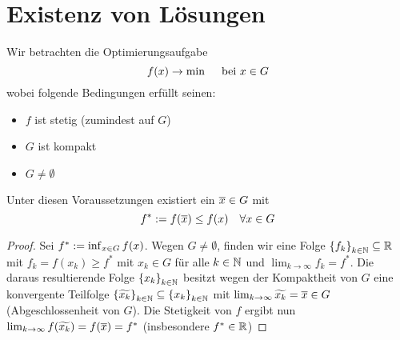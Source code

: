 \section{Existenz von Lösungen}

Wir betrachten die Optimierungsaufgabe
\begin{equation}
	f(x) \to \min \quad \text{ bei } x \in G \label{eq: 2.1}
\end{equation}
wobei folgende Bedingungen erfüllt seinen:
\begin{itemize}[nolistsep, topsep=-\parskip]
	\item $f$ ist stetig (zumindest auf $G$)
	\item $G$ ist kompakt
	\item $G \neq \emptyset$
\end{itemize}
\vspace{\parskip}

\begin{satz}[Weierstrass] \label{satz: 2.1_weierstrass}
	Unter diesen Voraussetzungen existiert ein $\overline{x} \in G$ mit 
	\begin{equation*}
		f^\ast \mathrel{:=} f(\overline{x}) \le f(x) \quad \forall x \in G
	\end{equation*}
\end{satz}
\begin{proof}
	Sei $f^\ast \mathrel{:=} \inf_{x \in G} f(x)$. Wegen $G \neq \emptyset$, finden wir eine Folge $\left\{ f_k \right\}_{k \in \mathbb{N}} \subseteq \mathbb{R}$ mit $f_k = f(x_k) \ge f^\ast$ mit $x_k \in G$ für alle $k \in \mathbb{N}$ und $\lim_{k \to \infty} f_k = f^\ast$. Die daraus resultierende Folge $\left\{ x_k \right\}_{k \in \mathbb{N}}$ besitzt wegen der Kompaktheit von $G$ eine konvergente Teilfolge $\left\{ \widetilde{x_k} \right\}_{k \in \mathbb{N}} \subseteq \left\{ x_k \right\}_{k \in \mathbb{N}}$ mit $\lim_{k \to \infty} \widetilde{x_k} = \overline{x} \in G$ (Abgeschlossenheit von $G$). Die Stetigkeit von $f$ ergibt nun $\lim_{k \to \infty} f(\widetilde{x_k}) = f(\overline{x}) = f^\ast$ (insbesondere $f^\ast \in \mathbb{R}$)
\end{proof}


